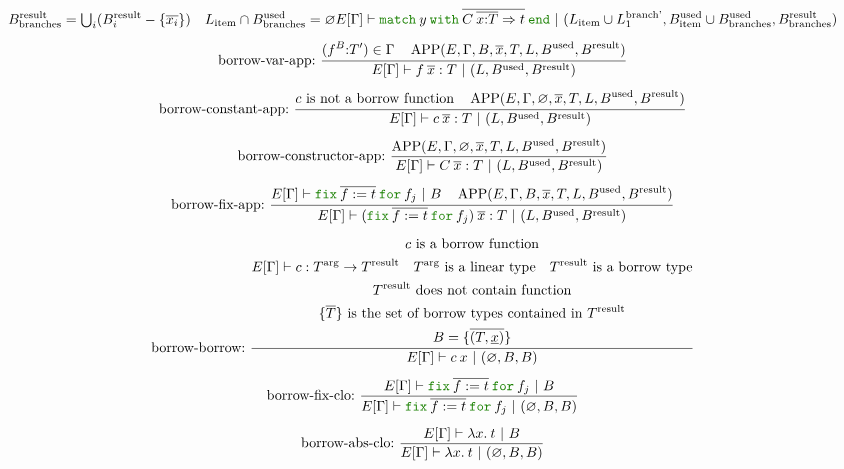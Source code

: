 \documentclass[a4paper,fleqn]{article}
\newcommand{\kwmatch}{\mbox{\color{mygreen}\ttfamily match}}
\newcommand{\kwwith}{\mbox{\color{mygreen}\ttfamily with}}
\newcommand{\kwend}{\mbox{\color{mygreen}\ttfamily end}}
\newcommand{\kwfix}{\mbox{\color{mygreen}\ttfamily fix}}
\newcommand{\kwfor}{\mbox{\color{mygreen}\ttfamily for}}
\newcommand{\lam}[2]{\lambda #1.\:#2}
\newcommand{\lassum}[2]{(#1\mathord{:}#2)}
\newcommand{\omatch}[2]{\kwmatch\:#1\:\kwwith\:{#2}\:\kwend}
\newcommand{\ofix}[2]{\kwfix\:{#1}\:\kwfor\:{#2}}
\newcommand{\tbigcup}{{\textstyle\bigcup}}
\newcommand{\breakrule}{\\[0.5em]}
\DeclareMathOperator{\APP}{APP}
\newcommand{\rep}[1]{\overline{#1}}
\begin{document}
\begin{gather*}
{\begin{gathered}
        B^\text{result}_\text{branches} = \tbigcup_i (B^\text{result}_i - \{\rep{x_i}\}) \quad
        L_\text{item} \cap B^\text{used}_\text{branches} = \varnothing \\
      \end{gathered}
    }{
      E[\Gamma] \vdash \omatch{y}{\rep{C\: \rep{x{:}T} \Rightarrow t}} ~|~ (L_\text{item} \cup L^\text{branch'}_1, B^\text{used}_\text{item} \cup B^\text{used}_\text{branches}, B^\text{result}_\text{branches})
    } \breakrule
  \text{borrow-var-app:}~
    \dfrac{
      \begin{gathered}
        \lassum{f^{B}}{T'} \in \Gamma \quad
        \APP(E, \Gamma, B, \rep{x}, T, L, B^\text{used}, B^\text{result})
      \end{gathered}
    }{
      E[\Gamma] \vdash f\:\rep{x} : T ~|~ (L, B^\text{used}, B^\text{result})
    } \breakrule
  \text{borrow-constant-app:}~
    \dfrac{
      \begin{gathered}
        \text{$c$ is not a borrow function} \quad
        \APP(E, \Gamma, \varnothing, \rep{x}, T, L, B^\text{used}, B^\text{result})
      \end{gathered}
    }{
      E[\Gamma] \vdash c\:\rep{x} : T ~|~ (L, B^\text{used}, B^\text{result})
    } \breakrule
  \text{borrow-constructor-app:}~
    \dfrac{
      \APP(E, \Gamma, \varnothing, \rep{x}, T, L, B^\text{used}, B^\text{result})
    }{
      E[\Gamma] \vdash C\: \rep{x} : T ~|~ (L, B^\text{used}, B^\text{result})
    } \breakrule
  \text{borrow-fix-app:}~
    \dfrac{
      \begin{gathered}
        E[\Gamma] \vdash \ofix{\rep{f:=t}}{f_j} ~|~ B \quad
        \APP(E, \Gamma, B, \rep{x}, T, L, B^\text{used}, B^\text{result})
      \end{gathered}
    }{
      E[\Gamma] \vdash (\ofix{\rep{f:=t}}{f_j})\:\rep{x} : T ~|~ (L, B^\text{used}, B^\text{result})
    } \breakrule
  \text{borrow-borrow:}~
    \dfrac{
      \begin{gathered}
        \text{$c$ is a borrow function} \\
        E[\Gamma] \vdash c : T^\text{arg} \rightarrow T^\text{result} \quad
        \text{$T^\text{arg}$ is a linear type} \quad
        \text{$T^\text{result}$ is a borrow type} \\
        \text{$T^\text{result}$ does not contain function} \\
        \text{$\{\rep{T}\}$ is the set of borrow types contained in $T^\text{result}$} \\
        B = \{\rep{(T,\underline{x})}\}
      \end{gathered}
    }{
      E[\Gamma] \vdash c\:x ~|~ (\varnothing, B, B)
    } \breakrule
  \text{borrow-fix-clo:}~
    \dfrac{
      E[\Gamma] \vdash \ofix{\rep{f:=t}}{f_j} ~|~ B
    }{
      E[\Gamma] \vdash \ofix{\rep{f:=t}}{f_j} ~|~ (\varnothing, B, B)
    } \breakrule
  \text{borrow-abs-clo:}~
    \dfrac{
      E[\Gamma] \vdash \lam{x}{t} ~|~ B
    }{
      E[\Gamma] \vdash \lam{x}{t} ~|~ (\varnothing, B, B)
    }
\end{gather*}
\end{document}
